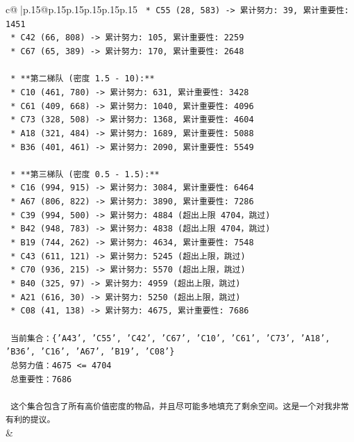 \documentclass{article}
\begin{document}
{\begin{supertabular}{c@{$\;$}|p{.15\linewidth}@{}p{.15\linewidth}p{.15\linewidth}p{.15\linewidth}p{.15\linewidth}p{.15\linewidth}}
{{{\texttt{        *   C55 (28, 583) {-}> 累计努力: 39, 累计重要性: 1451} \\
\texttt{        *   C42 (66, 808) {-}> 累计努力: 105, 累计重要性: 2259} \\
\texttt{        *   C67 (65, 389) {-}> 累计努力: 170, 累计重要性: 2648} \\
\\ 
\texttt{    *   **第二梯队 (密度 1.5 {-} 10):**} \\
\texttt{        *   C10 (461, 780) {-}> 累计努力: 631, 累计重要性: 3428} \\
\texttt{        *   C61 (409, 668) {-}> 累计努力: 1040, 累计重要性: 4096} \\
\texttt{        *   C73 (328, 508) {-}> 累计努力: 1368, 累计重要性: 4604} \\
\texttt{        *   A18 (321, 484) {-}> 累计努力: 1689, 累计重要性: 5088} \\
\texttt{        *   B36 (401, 461) {-}> 累计努力: 2090, 累计重要性: 5549} \\
\\ 
\texttt{    *   **第三梯队 (密度 0.5 {-} 1.5):**} \\
\texttt{        *   C16 (994, 915) {-}> 累计努力: 3084, 累计重要性: 6464} \\
\texttt{        *   A67 (806, 822) {-}> 累计努力: 3890, 累计重要性: 7286} \\
\texttt{        *   C39 (994, 500) {-}> 累计努力: 4884 (超出上限 4704，跳过)} \\
\texttt{        *   B42 (948, 783) {-}> 累计努力: 4838 (超出上限 4704，跳过)} \\
\texttt{        *   B19 (744, 262) {-}> 累计努力: 4634, 累计重要性: 7548} \\
\texttt{        *   C43 (611, 121) {-}> 累计努力: 5245 (超出上限，跳过)} \\
\texttt{        *   C70 (936, 215) {-}> 累计努力: 5570 (超出上限，跳过)} \\
\texttt{        *   B40 (325, 97) {-}> 累计努力: 4959 (超出上限，跳过)} \\
\texttt{        *   A21 (616, 30) {-}> 累计努力: 5250 (超出上限，跳过)} \\
\texttt{        *   C08 (41, 138) {-}> 累计努力: 4675, 累计重要性: 7686} \\
\\ 
\texttt{    当前集合：\{'A43', 'C55', 'C42', 'C67', 'C10', 'C61', 'C73', 'A18', 'B36', 'C16', 'A67', 'B19', 'C08'\}} \\
\texttt{    总努力值：4675 <= 4704} \\
\texttt{    总重要性：7686} \\
\\ 
\texttt{    这个集合包含了所有高价值密度的物品，并且尽可能多地填充了剩余空间。这是一个对我非常有利的提议。} \\
            }
        }
    }
    & \\ \\


\end{supertabular}}
\end{document}
